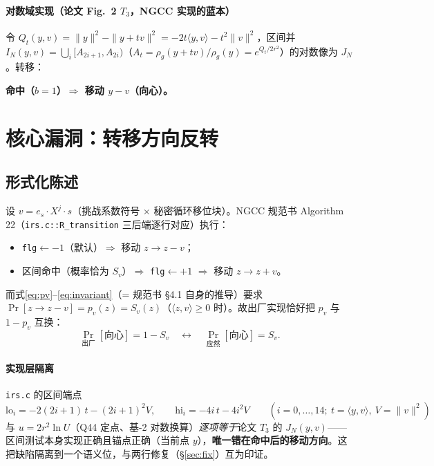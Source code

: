 \documentclass[11pt,a4paper]{ctexart}
\begin{document}
\paragraph{对数域实现（论文 Fig.~2 $T_3$，NGCC 实现的蓝本）} 令 $Q_t(y,v)=\|y\|^2-\|y+tv\|^2=-2t\langle y,v\rangle-t^2\|v\|^2$，区间并 $I_N(y,v)=\bigcup_i[A_{2i+1},A_{2i})$（$A_t=\rho_g(y+tv)/\rho_g(y)=e^{Q_t/2r^2}$）的对数像为 $J_N$。转移：
\begin{center}
\fbox{$u\leftarrow U([0,1))$；\ $\lambda\leftarrow 2r^2\log u$；\ $b\leftarrow[\lambda\in J_N(y,v)]$；\ \textbf{return } $y+(-1)^b\,v$}
\end{center}
\textbf{命中（$b{=}1$）$\Rightarrow$ 移动 $y-v$（向心）。}

\section{核心漏洞：转移方向反转}\label{sec:bug}

\subsection{形式化陈述}

设 $v=e_s\cdot X^j\cdot s$（挑战系数符号 $\times$ 秘密循环移位块）。NGCC 规范书 Algorithm 22（\texttt{irs.c::R\_transition} 三后端逐行对应）执行：
\begin{itemize}[nosep]
\item \texttt{flg}$\leftarrow -1$（默认）$\Rightarrow$ 移动 $z\to z-v$；
\item 区间命中（概率恰为 $S_v$）$\Rightarrow$ \texttt{flg}$\leftarrow +1$ $\Rightarrow$ 移动 $z\to z+v$。
\end{itemize}
而式\eqref{eq:pv}--\eqref{eq:invariant}（= 规范书 \S4.1 自身的推导）要求 $\Pr[z\to z-v]=p_v(z)=S_v(z)$（$\langle z,v\rangle\ge0$ 时）。故出厂实现恰好把 $p_v$ 与 $1-p_v$ 互换：
\begin{equation}
\Pr_{\text{出厂}}[\text{向心}]=1-S_v \quad\longleftrightarrow\quad \Pr_{\text{应然}}[\text{向心}]=S_v .
\end{equation}

\paragraph{实现层隔离} \texttt{irs.c} 的区间端点
\begin{equation}
\mathrm{lo}_i=-2(2i{+}1)\,t-(2i{+}1)^2V,\qquad \mathrm{hi}_i=-4i\,t-4i^2V\qquad(i=0,\dots,14;\ t=\langle y,v\rangle,\ V=\|v\|^2)
\end{equation}
与 $u=2r^2\ln U$（Q44 定点、基-2 对数换算）\emph{逐项等于}论文 $T_3$ 的 $J_N(y,v)$——区间测试本身实现正确且锚点正确（当前点 $y$），\textbf{唯一错在命中后的移动方向}。这把缺陷隔离到一个语义位，与两行修复（\S\ref{sec:fix}）互为印证。
\end{document}
